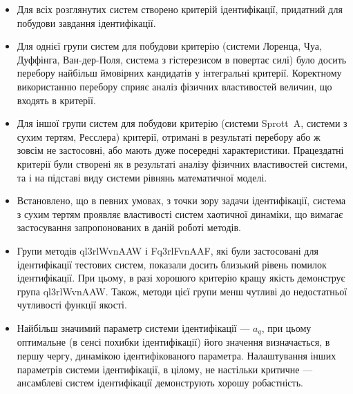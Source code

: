 \begin{itemize}

  \item
    Для всіх розглянутих систем створено критерій
    ідентифікації, придатний для побудови завдання ідентифікації.

  \item
    Для однієї групи систем для побудови критерію (системи Лоренца,
    Чуа, Дуффінга, Ван-дер-Поля, система з гістерезисом в повертає
    силі) було досить перебору найбільш ймовірних кандидатів у
    інтегральні критерії. Коректному використанню перебору сприяє
    аналіз фізичних властивостей величин, що входять в критерії.

  \item
    Для іншої групи систем для побудови критерію (системи Sprott~A,
    системи з сухим тертям, Ресслера) критерії, отримані в результаті
    перебору або ж зовсім не застосовні, або мають дуже посередні
    характеристики. Працездатні критерії були створені як в
    результаті аналізу фізичних властивостей системи, та і на
    підставі виду системи рівнянь математичної моделі.


  \item
    Встановлено, що в певних умовах, з точки зору задачи
    ідентифікації, система з сухим тертям проявляє властивості
    систем хаотичної динаміки, що вимагає застосування
    запропонованих в даній роботі методів.


  \item
    Групи методів ql3rlWvnAAW і Fq3rlFvnAAF, які були застосовані для ідентифікації
    тестових систем, показали досить близький рівень помилок
    ідентифікації. При цьому, в разі хорошого критерію кращу якість
    демонструє група ql3rlWvnAAW. Також, методи цієї групи менш чутливі
    до недостатньої чутливості функції якості.

  \item
    Найбільш значимий параметр системи ідентифікації ---
    $a_q $, при цьому оптимальне (в сенсі похибки ідентифікації)
    його значення визначається, в першу чергу, динамікою
    ідентифікованого параметра. Налаштування інших параметрів
    системи ідентифікації, в цілому, не настільки критичне ---
    ансамблеві систем ідентифікації демонструють хорошу робастність.


\end{itemize}


